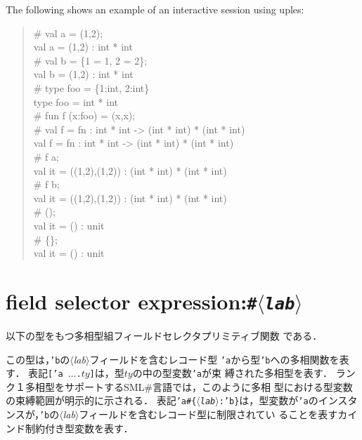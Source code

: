 \documentclass{jbook}
\newcommand{\txt}[2]{#2}
\newcommand{\smlsharp}{SML\#}
\newcommand{\code}[1]{\mbox{\large\tt #1}}
\newcommand{\nonterm}[1]{\mbox{$\langle$}{\it #1}\mbox{$\rangle$}}
\newcommand{\term}[1]{\mbox{{\tt #1}}}
\newenvironment{program}{\begin{quote}\begin{tt}}%
                        {\end{tt}\end{quote}}
\begin{document}
	The following shows an example of an interactive session using
uples:
\fi%
\begin{program}
\# val a = (1,2);
\\
val a = (1,2) : int * int
\\
\# val b = \{1 = 1, 2 = 2\};
\\
val b = (1,2) : int * int
\\
\# type foo = \{1:int, 2:int\}
\\
type foo = int * int
\\
\# fun f (x:foo) = (x,x);
\\
\# val f = fn : int * int -> (int * int) * (int * int)
\\
val f = fn : int * int -> (int * int) * (int * int)
\\
\# f a;
\\
val it = ((1,2),(1,2)) : (int * int) * (int * int)
\\
\# f b;
\\
val it = ((1,2),(1,2)) : (int * int) * (int * int)
\\
\# ();
\\
val it = () : unit
\\
\# \{\};
\\
val it = () : unit
\end{program}

\section{\txt{フィールドセレクタ式}{field selector expression}:\term{\#\nonterm{lab}}}

\ifjp%
	以下の型をもつ多相型組フィールドセレクタプリミティブ関数
である． 
\begin{program}
 ['a\#\{\nonterm{lab}:'b\}, 'b. 'a -> 'b]
\end{program}
	この型は，\code{'b}の\nonterm{lab}フィールドを含むレコード型
\code{'a}から型\code{'b}への多相関数を表す．
	表記\code{['a $\ldots$.$ty$]}は，型$ty$の中の型変数\code{'a}が束
縛された多相型を表す．
	ランク１多相型をサポートする\smlsharp{}言語では，このように多相
型における型変数の束縛範囲が明示的に示される．
	表記\code{'a\#\{\nonterm{lab}:'b\}}は，型変数が\code{'a}のインスタ
ンスが，\code{'b}の\nonterm{lab}フィールドを含むレコード型に制限されてい
ることを表すカインド制約付き型変数を表す．
\end{document}
